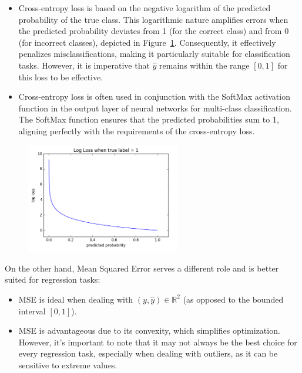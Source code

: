 \documentclass{article}
\theoremstyle{plain}%
\theoremstyle{definition}
\theoremstyle{remark}
\begin{document}
\begin{itemize}
    \item Cross-entropy loss is based on the negative logarithm of the predicted probability of the true class. This logarithmic nature amplifies errors when the predicted probability deviates from 1 (for the correct class) and from 0 (for incorrect classes), depicted in Figure~\ref{fig:CELoss}. Consequently, it effectively penalizes misclassifications, making it particularly suitable for classification tasks. However, it is imperative that $\hat{y}$ remains within the range $[0, 1]$ for this loss to be effective.
    \item Cross-entropy loss is often used in conjunction with the SoftMax activation function in the output layer of neural networks for multi-class classification. The SoftMax function ensures that the predicted probabilities sum to 1, aligning perfectly with the requirements of the cross-entropy loss.
\end{itemize}

\begin{figure}[H]
    \centering
    \includegraphics*[width=0.6\textwidth]{figs/cross_entropy.png}
    \caption{}
    \label{fig:CELoss}
\end{figure}

On the other hand, Mean Squared Error serves a different role and is better suited for regression tasks:

\begin{itemize}
    \item MSE is ideal when dealing with $(y, \hat{y}) \in \mathbb{R}^2$ (as opposed to the bounded interval $[0, 1]$).
    \item MSE is advantageous due to its convexity, which simplifies optimization. However, it's important to note that it may not always be the best choice for every regression task, especially when dealing with outliers, as it can be sensitive to extreme values.
\end{itemize}
\end{document}
